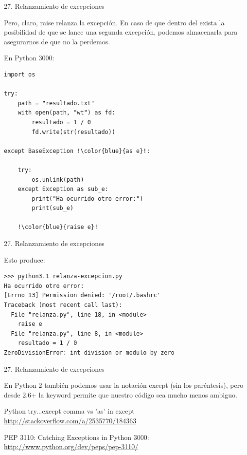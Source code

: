 \documentclass[14pt]{beamer}
\begin{document}
\begin{frame}[fragile]{27. Relanzamiento de excepciones}
  \footnotesize
  \begin{alertblock}{}
    \centering
    Pero, claro, raise relanza la  excepción. En
    caso de que dentro del  exista la posibilidad de
    que se lance una segunda excepción, podemos almacenarla para
    asegurarnos de que no la perdemos.
  \end{alertblock}

  \begin{exampleblock}
    {En Python 3000:}
    \tiny
    \begin{lstlisting}[escapechar=!]
import os

try:
    path = "resultado.txt"
    with open(path, "wt") as fd:
        resultado = 1 / 0
        fd.write(str(resultado))

except BaseException !\color{blue}{as e}!:

    try:
        os.unlink(path)
    except Exception as sub_e:
        print("Ha ocurrido otro error:")
        print(sub_e)

    !\color{blue}{raise e}!
    \end{lstlisting}
  \end{exampleblock}
\end{frame}

\begin{frame}[fragile]{27. Relanzamiento de excepciones}
  \footnotesize
  \begin{exampleblock}
    {Esto produce:}
    \begin{lstlisting}[escapechar=!]
>>> python3.1 relanza-excepcion.py
Ha ocurrido otro error:
[Errno 13] Permission denied: '/root/.bashrc'
Traceback (most recent call last):
  File "relanza.py", line 18, in <module>
    raise e
  File "relanza.py", line 8, in <module>
    resultado = 1 / 0
ZeroDivisionError: int division or modulo by zero
    \end{lstlisting}
  \end{exampleblock}
\end{frame}

\begin{frame}[fragile]{27. Relanzamiento de excepciones}
  \small
  \begin{block}{}
    \centering
    En Python 2 también podemos usar la notación except
     (sin los paréntesis), pero desde 2.6+ la
    keyword  permite que nuestro código sea mucho menos
    ambiguo.
  \end{block}

  \begin{block}
    {\centering Python try...except comma vs 'as' in except}
    \centering \url{http://stackoverflow.com/a/2535770/184363}
  \end{block}

    \begin{block}
    {\centering PEP 3110: Catching Exceptions in Python 3000:}
    \centering \url{http://www.python.org/dev/peps/pep-3110/}
  \end{block}
\end{frame}
\end{document}
